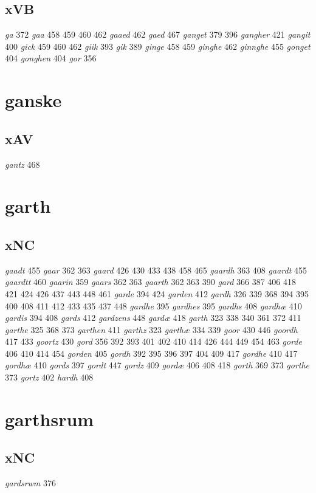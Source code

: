 \documentclass[a4paper,twocolumn]{article}
\begin{document}
\subsection{xVB}
\label{sec:orgeda04db}
\emph{ga} 372 \emph{gaa} 458 459 460 462 \emph{gaaed} 462 \emph{gaed} 467 \emph{ganget} 379 396 \emph{gangher} 421 \emph{gangit} 400 \emph{gick} 459 460 462 \emph{giik} 393 \emph{gik} 389 \emph{ginge} 458 459 \emph{ginghe} 462 \emph{ginnghe} 455 \emph{gonget} 404 \emph{gonghen} 404 \emph{gor} 356 
\section{ganske}
\label{sec:org632bd66}
\subsection{xAV}
\label{sec:org928d584}
\emph{gantz} 468 
\section{garth}
\label{sec:orgef6c93d}
\subsection{xNC}
\label{sec:org7ae4338}
\emph{gaadt} 455 \emph{gaar} 362 363 \emph{gaard} 426 430 433 438 458 465 \emph{gaardh} 363 408 \emph{gaardt} 455 \emph{gaardtt} 460 \emph{gaarin} 359 \emph{gaars} 362 363 \emph{gaarth} 362 363 390 \emph{gard} 366 387 406 418 421 424 426 437 443 448 461 \emph{garde} 394 424 \emph{garden} 412 \emph{gardh} 326 339 368 394 395 400 408 411 412 433 435 437 448 \emph{gardhe} 395 \emph{gardhes} 395 \emph{gardhs} 408 \emph{gardhæ} 410 \emph{gardis} 394 408 \emph{gards} 412 \emph{gardzens} 448 \emph{gardæ} 418 \emph{garth} 323 338 340 361 372 411 \emph{garthe} 325 368 373 \emph{garthen} 411 \emph{garthz} 323 \emph{garthæ} 334 339 \emph{goor} 430 446 \emph{goordh} 417 433 \emph{goortz} 430 \emph{gord} 356 392 393 401 402 410 414 426 444 449 454 463 \emph{gorde} 406 410 414 454 \emph{gorden} 405 \emph{gordh} 392 395 396 397 404 409 417 \emph{gordhe} 410 417 \emph{gordhæ} 410 \emph{gords} 397 \emph{gordt} 447 \emph{gordz} 409 \emph{gordæ} 406 408 418 \emph{gorth} 369 373 \emph{gorthe} 373 \emph{gortz} 402 \emph{hardh} 408 
\section{garthsrum}
\label{sec:orgbbd72f3}
\subsection{xNC}
\label{sec:org43c26bd}
\emph{gardsrwm} 376 
\end{document}
